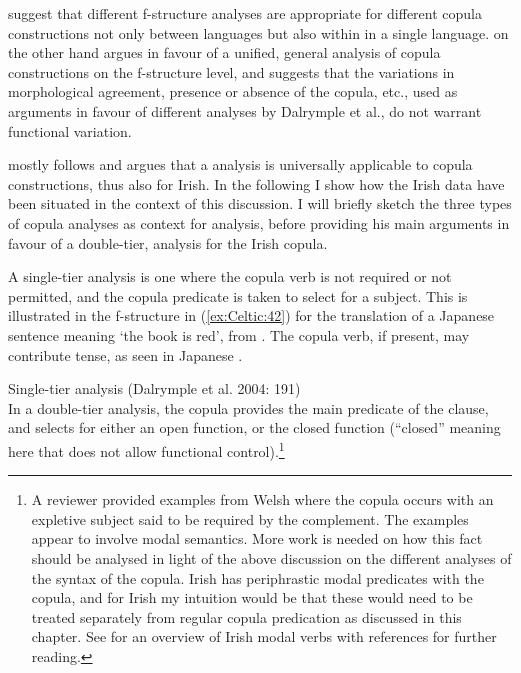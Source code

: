 \documentclass[output=paper,colorlinks,citecolor=brown]{langscibook}
\begin{document}
\citet{dalrympleetal04copular} suggest that different f-structure analyses are appropriate for different copula constructions not only between languages but also within in a single language. \citet{attia08} on the other hand argues in favour of a unified, general analysis of copula constructions on the f-structure level, and suggests that the variations in morphological agreement, presence or absence of the copula, etc., used as arguments in favour of different analyses by Dalrymple et al., do not warrant functional variation.

\citet{Sulger09} mostly follows \citet{attia08} and argues that a \PREDLINK analysis is universally applicable to copula constructions, thus also for Irish. In the following I show how the Irish data have been situated in the context of this discussion. I will briefly sketch the three types of copula analyses as context for  analysis, before providing his main arguments in favour of a double-tier, \PREDLINK analysis for the Irish copula.

A single-tier analysis is one where the copula verb is not required or not permitted, and the copula predicate is taken to select for a subject. This is illustrated in the f-structure in (\ref{ex:Celtic:42}) for the translation of a Japanese sentence meaning `the book is red', from \citet[191]{dalrympleetal04copular}. The copula verb, if present, may contribute tense, as seen in Japanese \citep{dalrympleetal04copular}.

\ea\label{ex:Celtic:42} Single-tier analysis (Dalrymple et al. 2004: 191)\\[1ex]
{}
\z
In a double-tier analysis, the copula provides the main predicate of the clause, and selects for either an open \XCOMP function, or the closed \PREDLINK function (``closed'' meaning here that \PREDLINK does not allow functional control).\footnote{A reviewer provided examples from Welsh where the copula occurs with an expletive subject said to be required by the complement. The examples appear to involve modal semantics. More work is needed on how this fact should be analysed in light of the above discussion on the different analyses of the syntax of the copula. Irish has periphrastic modal predicates with the copula, and for Irish my intuition would be that these would need to be treated separately from regular copula predication as discussed in this chapter. See \citet[86--94]{Graver2010} for an overview of Irish modal verbs with references for further reading.}
\end{document}
